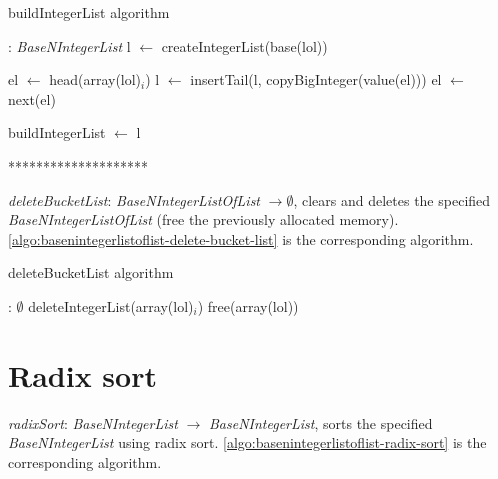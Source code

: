 \documentclass[book, nodocumentinfo]{upmethodology-document}
\newcommand{\separator}{\centerline{********************}}
\begin{document}
\begin{algorithm}[H]
    \caption{buildIntegerList algorithm}
    \label{algo:basenintegerlistoflist-build-integer-list}

    \begin{algorithmic}
         : \emph{BaseNIntegerList}
            \State l \(\leftarrow\) createIntegerList(base(lol))

                \State el \(\leftarrow\) head(array(lol)\(_i\))
                \State l \(\leftarrow\) insertTail(l, copyBigInteger(value(el)))
                    \State el \(\leftarrow\) next(el)
                \EndWhile
            \EndFor

            \State buildIntegerList \(\leftarrow\) l
        \EndFunction
    \end{algorithmic}
\end{algorithm}

\separator

\emph{deleteBucketList}: \emph{BaseNIntegerListOfList} \(\rightarrow \emptyset\),
clears and deletes the specified \emph{BaseNIntegerListOfList} (free the previously allocated
memory).
\ref{algo:basenintegerlistoflist-delete-bucket-list} is the corresponding algorithm.

\begin{algorithm}[H]
    \caption{deleteBucketList algorithm}
    \label{algo:basenintegerlistoflist-delete-bucket-list}

    \begin{algorithmic}
         : \(\emptyset\)
                \State deleteIntegerList(array(lol)\(_i\))
            \EndFor
            \State free(array(lol))
        \EndFunction
    \end{algorithmic}
\end{algorithm}

\newpage

\section{Radix sort}

\emph{radixSort}: \emph{BaseNIntegerList} \(\rightarrow\) \emph{BaseNIntegerList},
sorts the specified \emph{BaseNIntegerList} using radix sort.
\ref{algo:basenintegerlistoflist-radix-sort} is the corresponding algorithm.
\end{document}
